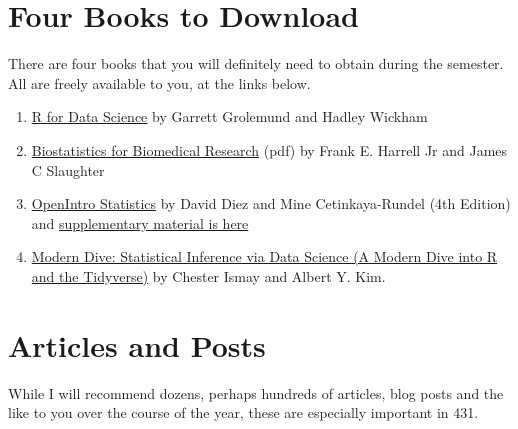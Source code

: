 \documentclass[
]{book}
\providecommand{\tightlist}{%
  \setlength{\itemsep}{0pt}\setlength{\parskip}{0pt}}
\begin{document}
\hypertarget{four-books-to-download}{%
\section{Four Books to Download}\label{four-books-to-download}}

There are four books that you will definitely need to obtain during the semester. All are freely available to you, at the links below.

\begin{enumerate}
\def\labelenumi{\arabic{enumi}.}
\tightlist
\item
  \href{https://r4ds.had.co.nz/}{R for Data Science} by Garrett Grolemund and Hadley Wickham
\item
  \href{http://hbiostat.org/doc/bbr.pdf}{Biostatistics for Biomedical Research} (pdf) by Frank E. Harrell Jr and James C Slaughter
\item
  \href{https://leanpub.com/openintro-statistics}{OpenIntro Statistics} by David Diez and Mine Cetinkaya-Rundel (4th Edition) and \href{https://www.openintro.org/stat/textbook.php?stat_book=os}{supplementary material is here}
\item
  \href{https://moderndive.netlify.com/}{Modern Dive: Statistical Inference via Data Science (A Modern Dive into R and the Tidyverse)} by Chester Ismay and Albert Y. Kim.
\end{enumerate}

\hypertarget{articles-and-posts}{%
\section{Articles and Posts}\label{articles-and-posts}}

While I will recommend dozens, perhaps hundreds of articles, blog posts and the like to you over the course of the year, these are especially important in 431.
\end{document}
